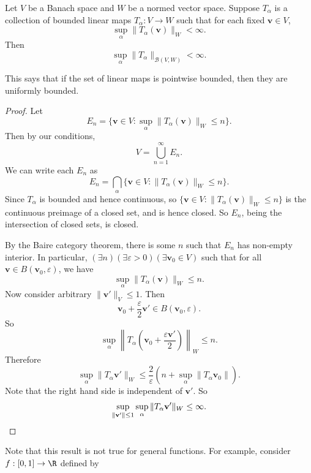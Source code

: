 \documentclass[a4paper]{article}
\begin{document}
\begin{thm}
  Let $V$ be a Banach space and $W$ be a normed vector space. Suppose $T_\alpha$ is a collection of bounded linear maps $T_\alpha: V\to W$ such that for each fixed $\mathbf{v} \in V$,
  \[
    \sup_\alpha \|T_\alpha (\mathbf{v})\|_W < \infty.
  \]
  Then
  \[
    \sup_\alpha \|T_\alpha\|_{\mathcal{B}(V, W)} < \infty.
  \]
\end{thm}
This says that if the set of linear maps is pointwise bounded, then they are uniformly bounded.
\begin{proof}
  Let
  \[
    E_n = \{\mathbf{v} \in V: \sup_\alpha \|T_\alpha(\mathbf{v})\|_W \leq n\}.
  \]
  Then by our conditions,
  \[
    V = \bigcup_{n = 1}^\infty E_n.
  \]
  We can write each $E_n$ as
  \[
    E_n = \bigcap_\alpha \{\mathbf{v} \in V: \|T_\alpha (\mathbf{v})\|_W \leq n\}.
  \]
  Since $T_\alpha$ is bounded and hence continuous, so $\{\mathbf{v} \in V: \|T_\alpha (\mathbf{v})\|_W\leq n\}$ is the continuous preimage of a closed set, and is hence closed. So $E_n$, being the intersection of closed sets, is closed.

  By the Baire category theorem, there is some $n$ such that $E_n$ has non-empty interior. In particular, $(\exists n) (\exists \varepsilon > 0)(\exists \mathbf{v}_0 \in V)$ such that for all $\mathbf{v}\in B(\mathbf{v}_0, \varepsilon)$, we have
  \[
    \sup_{\alpha} \|T_\alpha(\mathbf{v})\|_W \leq n.
  \]
  Now consider arbitrary $\|\mathbf{v}'\|_V \leq 1$. Then
  \[
    \mathbf{v}_0 + \frac{\varepsilon}{2} \mathbf{v}' \in B(\mathbf{v}_0, \varepsilon).
  \]
  So
  \[
    \sup_\alpha \left\|T_\alpha\left(\mathbf{v}_0 + \frac{\varepsilon \mathbf{v}'}{2}\right)\right\|_W \leq n.
  \]
  Therefore
  \[
    \sup_\alpha \|T_\alpha \mathbf{v}'\|_W \leq \frac{2}{\varepsilon} \left(n + \sup_\alpha \|T_\alpha \mathbf{v}_0\|\right).
  \]
  Note that the right hand side is independent of $\mathbf{v}'$. So
  \[
    \sup_{\|\mathbf{v}'\| \leq 1}\sup_\alpha \|T_\alpha \mathbf{v}'\|_W \leq \infty.\qedhere
  \]
\end{proof}
Note that this result is not true for general functions. For example, consider $f: [0, 1] \to \R$ defined by
\begin{center}
\end{center}
\end{document}
